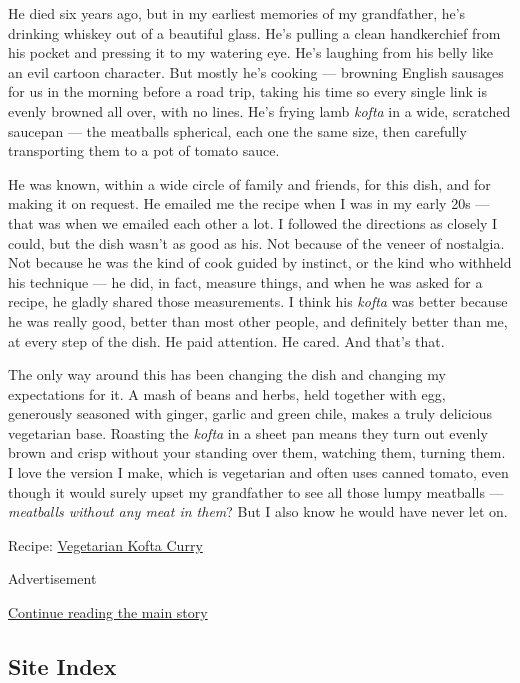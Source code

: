 He died six years ago, but in my earliest memories of my grandfather,
he's drinking whiskey out of a beautiful glass. He's pulling a clean
handkerchief from his pocket and pressing it to my watering eye. He's
laughing from his belly like an evil cartoon character. But mostly he's
cooking --- browning English sausages for us in the morning before a
road trip, taking his time so every single link is evenly browned all
over, with no lines. He's frying lamb \emph{kofta} in a wide, scratched
saucepan --- the meatballs spherical, each one the same size, then
carefully transporting them to a pot of tomato sauce.

He was known, within a wide circle of family and friends, for this dish,
and for making it on request. He emailed me the recipe when I was in my
early 20s --- that was when we emailed each other a lot. I followed the
directions as closely I could, but the dish wasn't as good as his. Not
because of the veneer of nostalgia. Not because he was the kind of cook
guided by instinct, or the kind who withheld his technique --- he did,
in fact, measure things, and when he was asked for a recipe, he gladly
shared those measurements. I think his \emph{kofta} was better because
he was really good, better than most other people, and definitely better
than me, at every step of the dish. He paid attention. He cared. And
that's that.

The only way around this has been changing the dish and changing my
expectations for it. A mash of beans and herbs, held together with egg,
generously seasoned with ginger, garlic and green chile, makes a truly
delicious vegetarian base. Roasting the \emph{kofta} in a sheet pan
means they turn out evenly brown and crisp without your standing over
them, watching them, turning them. I love the version I make, which is
vegetarian and often uses canned tomato, even though it would surely
upset my grandfather to see all those lumpy meatballs ---
\emph{meatballs without any meat in them}? But I also know he would have
never let on.

Recipe:
\href{https://cooking.nytimes3xbfgragh.onion/recipes/1021415-vegetarian-kofta-curry}{Vegetarian
Kofta Curry}

Advertisement

\protect\hyperlink{after-bottom}{Continue reading the main story}

\hypertarget{site-index}{%
\subsection{Site Index}\label{site-index}}

